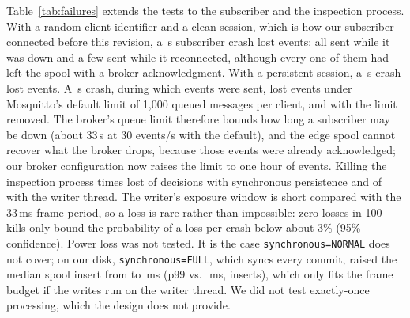 \documentclass[conference]{IEEEtran}
\begin{document}
Table~\ref{tab:failures} extends the tests to the subscriber and the inspection process. With a random client identifier and a clean session, which is how our subscriber connected before this revision, a \SubCleanDown{}\,s subscriber crash lost \SubCleanMissing{} events: all \SubCleanWhileDown{} sent while it was down and a few sent while it reconnected, although every one of them had left the spool with a broker acknowledgment. With a persistent session, a \SubPersistShortDown{}\,s crash lost \SubPersistShortMissing{} events. A \SubPersistLongDefaultDown{}\,s crash, during which \SubPersistLongDefaultWhileDown{} events were sent, lost \SubPersistLongDefaultMissing{} events under Mosquitto's default limit of 1{,}000 queued messages per client, and \SubPersistLongUnlimitedMissing{} with the limit removed. The broker's queue limit therefore bounds how long a subscriber may be down (about 33\,s at 30 events/s with the default), and the edge spool cannot recover what the broker drops, because those events were already acknowledged; our broker configuration now raises the limit to one hour of events. Killing the inspection process \CrashSyncKills{} times lost \CrashSyncLost{} of \CrashSyncHandedOff{} decisions with synchronous persistence and \CrashWriterLost{} of \CrashWriterHandedOff{} with the writer thread. The writer's exposure window is short compared with the 33\,ms frame period, so a loss is rare rather than impossible: zero losses in 100 kills only bound the probability of a loss per crash below about 3\% (95\% confidence). Power loss was not tested. It is the case \texttt{synchronous=NORMAL} does not cover; on our disk, \texttt{synchronous=FULL}, which syncs every commit, raised the median spool insert from \InsertNormalMedian{} to \InsertFullMedian{}\,ms (p99 \InsertNormalPNinetyNine{} vs.\ \InsertFullPNinetyNine{}\,ms, \InsertCount{} inserts), which only fits the frame budget if the writes run on the writer thread. We did not test exactly-once processing, which the design does not provide.
\end{document}
